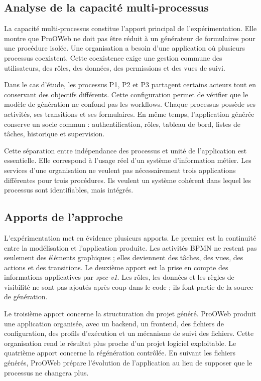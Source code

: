 \subsection{Analyse de la capacité multi-processus}

La capacité multi-processus constitue l'apport principal de l'expérimentation. Elle montre que ProOWeb ne doit pas être réduit à un générateur de formulaires pour une procédure isolée. Une organisation a besoin d'une application où plusieurs processus coexistent. Cette coexistence exige une gestion commune des utilisateurs, des rôles, des données, des permissions et des vues de suivi.

Dans le cas d'étude, les processus P1, P2 et P3 partagent certains acteurs tout en conservant des objectifs différents. Cette configuration permet de vérifier que le modèle de génération ne confond pas les workflows. Chaque processus possède ses activités, ses transitions et ses formulaires. En même temps, l'application générée conserve un socle commun : authentification, rôles, tableau de bord, listes de tâches, historique et supervision.

Cette séparation entre indépendance des processus et unité de l'application est essentielle. Elle correspond à l'usage réel d'un système d'information métier. Les services d'une organisation ne veulent pas nécessairement trois applications différentes pour trois procédures. Ils veulent un système cohérent dans lequel les processus sont identifiables, mais intégrés.

\subsection{Apports de l'approche}

L'expérimentation met en évidence plusieurs apports. Le premier est la continuité entre la modélisation et l'application produite. Les activités BPMN ne restent pas seulement des éléments graphiques ; elles deviennent des tâches, des vues, des actions et des transitions. Le deuxième apport est la prise en compte des informations applicatives par \textit{spec-v1}. Les rôles, les données et les règles de visibilité ne sont pas ajoutés après coup dans le code ; ils font partie de la source de génération.

Le troisième apport concerne la structuration du projet généré. ProOWeb produit une application organisée, avec un backend, un frontend, des fichiers de configuration, des profils d'exécution et un mécanisme de suivi des fichiers. Cette organisation rend le résultat plus proche d'un projet logiciel exploitable. Le quatrième apport concerne la régénération contrôlée. En suivant les fichiers générés, ProOWeb prépare l'évolution de l'application au lieu de supposer que le processus ne changera plus.

